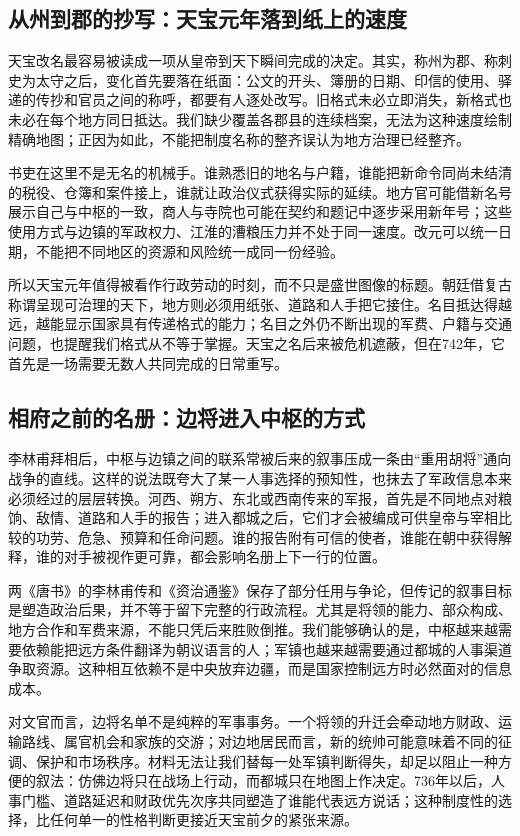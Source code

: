 \subsection{从州到郡的抄写：天宝元年落到纸上的速度}
天宝改名最容易被读成一项从皇帝到天下瞬间完成的决定。其实，称州为郡、称刺史为太守之后，变化首先要落在纸面：公文的开头、簿册的日期、印信的使用、驿递的传抄和官员之间的称呼，都要有人逐处改写。旧格式未必立即消失，新格式也未必在每个地方同日抵达。我们缺少覆盖各郡县的连续档案，无法为这种速度绘制精确地图；正因为如此，不能把制度名称的整齐误认为地方治理已经整齐。

书吏在这里不是无名的机械手。谁熟悉旧的地名与户籍，谁能把新命令同尚未结清的税役、仓簿和案件接上，谁就让政治仪式获得实际的延续。地方官可能借新名号展示自己与中枢的一致，商人与寺院也可能在契约和题记中逐步采用新年号；这些使用方式与边镇的军政权力、江淮的漕粮压力并不处于同一速度。改元可以统一日期，不能把不同地区的资源和风险统一成同一份经验。

所以天宝元年值得被看作行政劳动的时刻，而不只是盛世图像的标题。朝廷借复古称谓呈现可治理的天下，地方则必须用纸张、道路和人手把它接住。名目抵达得越远，越能显示国家具有传递格式的能力；名目之外仍不断出现的军费、户籍与交通问题，也提醒我们格式从不等于掌握。天宝之名后来被危机遮蔽，但在742年，它首先是一场需要无数人共同完成的日常重写。

\subsection{相府之前的名册：边将进入中枢的方式}
李林甫拜相后，中枢与边镇之间的联系常被后来的叙事压成一条由“重用胡将”通向战争的直线。这样的说法既夸大了某一人事选择的预知性，也抹去了军政信息本来必须经过的层层转换。河西、朔方、东北或西南传来的军报，首先是不同地点对粮饷、敌情、道路和人手的报告；进入都城之后，它们才会被编成可供皇帝与宰相比较的功劳、危急、预算和任命问题。谁的报告附有可信的使者，谁能在朝中获得解释，谁的对手被视作更可靠，都会影响名册上下一行的位置。

两《唐书》的李林甫传和《资治通鉴》保存了部分任用与争论，但传记的叙事目标是塑造政治后果，并不等于留下完整的行政流程。尤其是将领的能力、部众构成、地方合作和军费来源，不能只凭后来胜败倒推。我们能够确认的是，中枢越来越需要依赖能把远方条件翻译为朝议语言的人；军镇也越来越需要通过都城的人事渠道争取资源。这种相互依赖不是中央放弃边疆，而是国家控制远方时必然面对的信息成本。

对文官而言，边将名单不是纯粹的军事事务。一个将领的升迁会牵动地方财政、运输路线、属官机会和家族的交游；对边地居民而言，新的统帅可能意味着不同的征调、保护和市场秩序。材料无法让我们替每一处军镇判断得失，却足以阻止一种方便的叙法：仿佛边将只在战场上行动，而都城只在地图上作决定。736年以后，人事门槛、道路延迟和财政优先次序共同塑造了谁能代表远方说话；这种制度性的选择，比任何单一的性格判断更接近天宝前夕的紧张来源。
